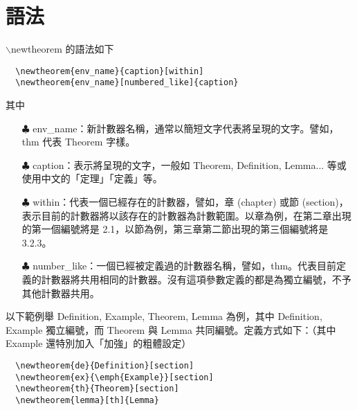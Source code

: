 \section{{\MB 語法}}
{\A $\backslash$newtheorem} 的語法如下
\bigskip
	\begin{lstlisting}
  \newtheorem{env_name}{caption}[within]
  \newtheorem{env_name}[numbered_like]{caption}
	\end{lstlisting}
\bigskip
其中
\begin{itemize}
\item[$\clubsuit$] env\_name：新計數器名稱，通常以簡短文字代表將呈現的文字。譬如， thm 代表 Theorem 字樣。
\item[$\clubsuit$] caption：表示將呈現的文字，一般如 Theorem, Definition, Lemma... 等或使用中文的「定理」「定義」等。
\item[$\clubsuit$] within：代表一個已經存在的計數器，譬如，章 (chapter) 或節 (section)，表示目前的計數器將以該存在的計數器為計數範圍。以章為例，在第二章出現的第一個編號將是 2.1，以節為例，第三章第二節出現的第三個編號將是 3.2.3。
\item[$\clubsuit$] number\_like：一個已經被定義過的計數器名稱，譬如，thm。代表目前定義的計數器將共用相同的計數器。沒有這項參數定義的都是為獨立編號，不予其他計數器共用。
\end{itemize}
以下範例舉 Definition, Example, Theorem, Lemma 為例，其中 Definition, Example 獨立編號，而 Theorem 與 Lemma 共同編號。定義方式如下：（其中 Example 還特別加入「加強」的粗體設定）
\bigskip
	\begin{lstlisting}
  \newtheorem{de}{Definition}[section]
  \newtheorem{ex}{\emph{Example}}[section]
  \newtheorem{th}{Theorem}[section]
  \newtheorem{lemma}[th]{Lemma}
	\end{lstlisting}



